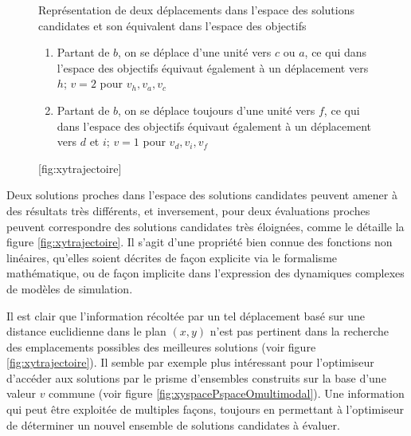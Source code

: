 \begin{figure}[!htbp]
	\begin{sidecaption}{Représentation de deux déplacements dans l'espace des solutions candidates et son équivalent dans l'espace des objectifs
	\parbox{\marginparwidth}{
	\begin{enumerate}[label=(\alph*),labelindent=\parindent,leftmargin=*]
	        \item Partant de $b$, on se déplace d'une unité vers $c$ ou $a$, ce qui dans l'espace des objectifs équivaut également à un déplacement vers $h$; $v=2$ pour $v_h, v_a, v_c$
	        \item Partant de $b$, on se déplace toujours d'une unité vers $f$, ce qui dans l'espace des objectifs équivaut également à un déplacement vers $d$ et $i$; $v=1$ pour $v_d,v_i,v_f$
	\end{enumerate}}}[fig:xytrajectoire]
	 \centering
	  \qquad
	\end{sidecaption}
\end{figure}

Deux solutions proches dans l'espace des solutions candidates peuvent amener à des résultats très différents, et inversement, pour deux évaluations proches peuvent correspondre des solutions candidates très éloignées, comme le détaille la figure \ref{fig:xytrajectoire}. Il s'agit d'une propriété bien connue des fonctions non linéaires, qu'elles soient décrites de façon explicite via le formalisme mathématique, ou de façon implicite dans l'expression des dynamiques complexes de modèles de simulation.

Il est clair que l'information récoltée par un tel déplacement basé sur une distance euclidienne dans le plan $(x,y)$ n'est pas pertinent dans la recherche des emplacements possibles des meilleures solutions (voir figure \ref{fig:xytrajectoire}). Il semble par exemple plus intéressant pour l'optimiseur d'accéder aux solutions par le prisme d'ensembles construits sur la base d'une valeur $v$ commune (voir figure \ref{fig:xyspacePspaceOmultimodal}). Une information qui peut être exploitée de multiples façons, toujours en permettant à l'optimiseur de déterminer un nouvel ensemble de solutions candidates à évaluer.

